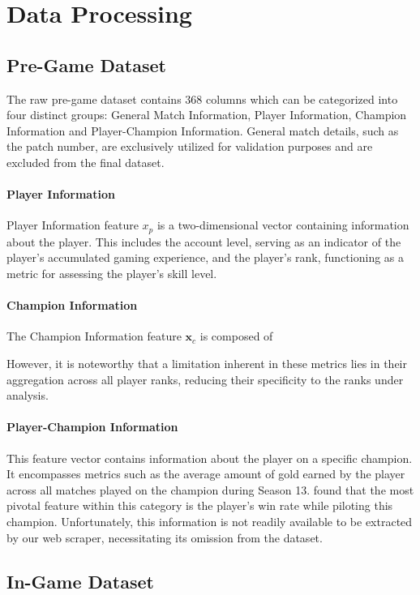 \documentclass[12pt, a4paper, headinclude, twoside, plainheadsepline, open=right, numbers=noenddot, hidelinks, toc=listof, toc=bibliography]{scrreprt}
\begin{document}
\section{Data Processing}
\label{sec:data_processing}

\subsection{Pre-Game Dataset}
\label{ssec:pre_game_data}
The raw pre-game dataset contains $368$ columns which can be categorized into four distinct groups: General Match Information, Player Information, Champion Information and Player-Champion Information.
General match details, such as the patch number, are exclusively utilized for validation purposes and are excluded from the final dataset.
\paragraph{Player Information}
Player Information feature $x_p$ is a two-dimensional vector containing information about the player. This includes the account level, serving as an indicator of the player's accumulated gaming experience, and the player's rank, functioning as a metric for assessing the player's skill level.
\paragraph{Champion Information}
The Champion Information feature $\mathbf{x}_c$ is composed of 

However, it is noteworthy that a limitation inherent in these metrics lies in their aggregation across all player ranks, reducing their specificity to the ranks under analysis.
\paragraph{Player-Champion Information}
This feature vector contains information about the player on a specific champion.
It encompasses metrics such as the average amount of gold earned by the player across all matches played on the champion during Season 13. 
 \cite{costaFeatureAnalysisLeague2021} found that  the most pivotal feature within this category is the player's win rate while piloting this champion.
Unfortunately, this information is not readily available to be extracted by our web scraper,  necessitating its omission from the dataset.


\subsection{In-Game Dataset}
\label{ssec:in_game_data}
\end{document}
